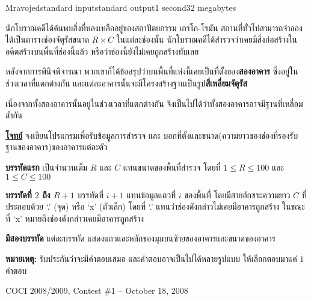\documentclass[11pt,a4paper]{article}
\begin{document}
\begin{problem}{Mravojed}{standard input}{standard output}{1 second}{32 megabytes}

นักโบราณคดีได้ค้นพบสิ่งที่หลงเหลืออยู่ของสถาปัตยกรรม เกรโก-โรมัน สถานที่ทั่วไปสามารถจำลองได้เป็นตารางช่องจัตุรัสขนาด $R \times C$ ในแต่ละช่องนั้น นักโบราณคดีได้สำรวจว่าเคยมีสิ่งก่อสร้างในอดีตสร้างบนพื้นที่ช่องนี้แล้ว หรือว่าช่องนี้ยังไม่เคยถูกสร้างทับเลย

หลังจากการพินิจพิจารณา พวกเขาก็ได้ข้อสรุปว่าบนพื้นที่แห่งนี้เคยเป็นที่ตั้งของ\textbf{สองอาคาร} ซึ่งอยู่ในช่วงเวลาที่แตกต่างกัน และแต่ละอาคารนั้นจะมีโครงสร้างฐานเป็นรูป\textbf{สี่เหลี่ยมจัตุรัส}

เนื่องจากทั้งสองอาคารนั้นอยู่ในช่วงเวลาที่แตกต่างกัน จึงเป็นไปได้ว่าทั้งสองอาคารอาจมีฐานที่เหลื่อมล้ำกัน

\bigskip
\underline{\textbf{โจทย์}}  จงเขียนโปรแกรมเพื่อรับข้อมูลการสำรวจ และ บอกที่ตั้งและขนาด(ความยาวของช่องที่รองรับฐานของอาคาร)ของอาคารแต่ละตัว

\InputFile

\textbf{บรรทัดแรก} เป็นจำนวนเต็ม $R$ และ $C$ แทนขนาดของพื้นที่สำรวจ โดยที่ $1 \leq R \leq 100$ และ $1 \leq C \leq 100$ 

\textbf{บรรทัดที่ $2$ ถึง $R+1$} บรรทัดที่ $i+1$ แทนข้อมูลแถวที่ $i$ ของพื้นที่ โดยมีสายอักขระความยาว $C$ ที่ประกอบด้วย ‘.’ (จุด) หรือ ‘x’ (ตัวเล็ก) โดยที่ ‘.’ แทนว่าช่องดังกล่าวไม่เคยมีอาคารถูกสร้าง ในขณะที่ ‘x’ หมายถึงช่องดังกล่าวเคยมีอาคารถูกสร้าง


\OutputFile

\textbf{มีสองบรรทัด} แต่ละบรรทัด แสดงแถวและหลักของมุมบนซ้ายของอาคารและขนาดของอาคาร

\textbf{หมายเหตุ:} รับประกันว่าจะมีคำตอบเสมอ และคำตอบอาจเป็นไปได้หลายรูปแบบ ให้เลือกตอบมาแค่ $1$ คำตอบ

\Examples

\begin{example}
%
%
%
\end{example}


\Source

COCI 2008/2009, Contest \#1 – October 18, 2008


\end{problem}
\end{document}
